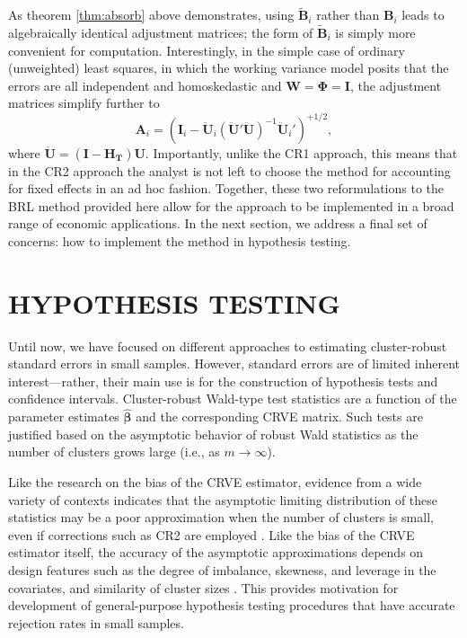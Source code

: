 \documentclass[12pt]{article}\usepackage[]{graphicx}\usepackage[]{color}
\newcommand{\bm}{\mathbf}
\newcommand{\bs}{\boldsymbol}
\begin{document}
As theorem \ref{thm:absorb} above demonstrates, using $\bm{\tilde{B}}_i$ rather than $\bm{B}_i$ leads to algebraically identical adjustment matrices; the form of $\bm{\tilde{B}}_i$ is simply more convenient for computation.
Interestingly, in the simple case of ordinary (unweighted) least squares, in which the working variance model posits that the errors are all independent and homoskedastic and $\bm{W} = \bs\Phi = \bm{I}$, the adjustment matrices simplify further to \[
\bm{A}_i = \left(\bm{I}_i - \bm{\ddot{U}}_i\left(\bm{\ddot{U}}'\bm{\ddot{U}}\right)^{-1}\bm{\ddot{U}}_i'\right)^{+1/2},\]
where $\bm{\ddot{U}} = \left(\bm{I} - \bm{H_T}\right)\bm{U}$.
Importantly, unlike the CR1 approach, this means that in the CR2 approach the analyst is not left to choose the method for accounting for fixed effects in an ad hoc fashion.
Together, these two reformulations to the BRL method provided here allow for the approach to be implemented in a broad range of economic applications.
In the next section, we address a final set of concerns: how to implement the method in hypothesis testing. 


\section{HYPOTHESIS TESTING}
\label{sec:testing}

Until now, we have focused on different approaches to estimating cluster-robust standard errors in small samples. 
However, standard errors are of limited inherent interest---rather, their main use is for the construction of hypothesis tests and confidence intervals.
Cluster-robust Wald-type test statistics are a function of the parameter estimates $\bs{\hat\beta}$ and the corresponding CRVE matrix.
Such tests are justified based on the asymptotic behavior of robust Wald statistics as the number of clusters grows large (i.e., as $m \to \infty$). 

Like the research on the bias of the CRVE estimator, evidence from a wide variety of contexts indicates that the asymptotic limiting distribution of these statistics may be a poor approximation when the number of clusters is small, even if corrections such as CR2 are employed \citep{Bell2002bias, Bertrand2004how, Cameron2008bootstrap}. 
Like the bias of the CRVE estimator itself, the accuracy of the asymptotic approximations depends on design features such as the degree of imbalance, skewness, and leverage in the covariates, and similarity of cluster sizes \citep{McCaffrey2001generalizations, Tipton2015small-F, Webb2013wild}. 
This provides motivation for development of general-purpose hypothesis testing procedures that have accurate rejection rates in small samples.
\end{document}
